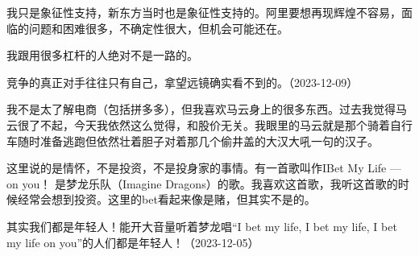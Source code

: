 
我只是象征性支持，新东方当时也是象征性支持的。阿里要想再现辉煌不容易，面临的问题和困难很多，不确定性很大，但机会可能还在。


我跟用很多杠杆的人绝对不是一路的。


竞争的真正对手往往只有自己，拿望远镜确实看不到的。（2023-12-09）

我不是太了解电商（包括拼多多），但我喜欢马云身上的很多东西。过去我觉得马云很了不起，今天我依然这么觉得，和股价无关。我眼里的马云就是那个骑着自行车随时准备逃跑但依然壮着胆子对着那几个偷井盖的大汉大吼一句的汉子。

这里说的是情怀，不是投资，不是投身家的事情。有一首歌叫作IBet My Life — on you！ 是梦龙乐队（Imagine Dragons）的歌。我喜欢这首歌，我听这首歌的时候经常会想到投资。这里的bet看起来像是赌，但其实不是的。


其实我们都是年轻人！能开大音量听着梦龙唱“I bet my life, I bet my life, I bet my life on you”的人们都是年轻人！（2023-12-05）

